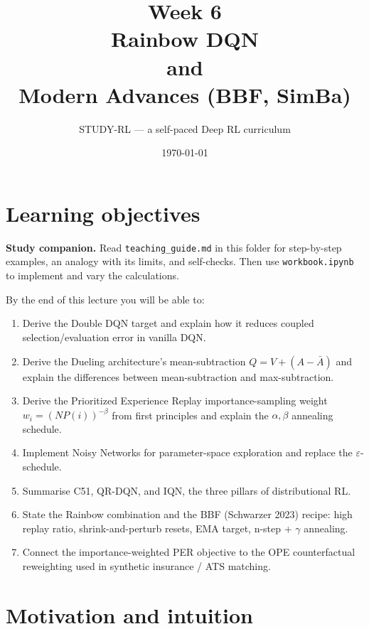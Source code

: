 \documentclass[11pt,oneside]{scrbook}
\title{{\color{rlblue}\textbf{Week 6}} \\[0.4em] \Huge Rainbow DQN \\[0.1em] and \\[0.1em] Modern Advances (BBF, SimBa)}
\author{STUDY-RL --- a self-paced Deep RL curriculum}
\date{\today}
\begin{document}
\maketitle
\tableofcontents
\newpage

\chapter*{Learning objectives}


\noindent\textbf{Study companion.} Read \texttt{teaching\_guide.md} in this
folder for step-by-step examples, an analogy with its limits, and self-checks.
Then use \texttt{workbook.ipynb} to implement and vary the calculations.
\par\medskip

\begin{keyidea}
By the end of this lecture you will be able to:
\begin{enumerate}
  \item Derive the Double DQN target and explain how it reduces coupled selection/evaluation error in vanilla DQN.
  \item Derive the Dueling architecture's mean-subtraction $Q = V + (A - \bar A)$ and explain the differences between mean-subtraction and max-subtraction.
  \item Derive the Prioritized Experience Replay importance-sampling weight $w_i = (N P(i))^{-\beta}$ from first principles and explain the $\alpha, \beta$ annealing schedule.
  \item Implement Noisy Networks for parameter-space exploration and replace the $\varepsilon$-schedule.
  \item Summarise C51, QR-DQN, and IQN, the three pillars of distributional RL.
  \item State the Rainbow combination and the BBF (Schwarzer 2023) recipe: high replay ratio, shrink-and-perturb resets, EMA target, n-step + $\gamma$ annealing.
  \item Connect the importance-weighted PER objective to the OPE counterfactual reweighting used in synthetic insurance / ATS matching.
\end{enumerate}
\end{keyidea}

\chapter{Motivation and intuition}
\end{document}
